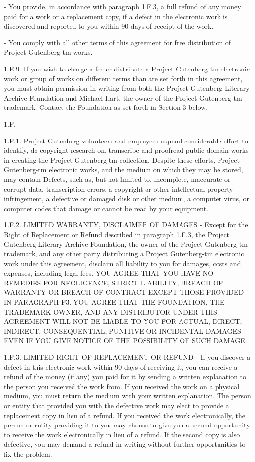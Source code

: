 \documentclass[twocolumn]{article}
\begin{document}
- You provide, in accordance with paragraph 1.F.3, a full refund of any
     money paid for a work or a replacement copy, if a defect in the
     electronic work is discovered and reported to you within 90 days
     of receipt of the work.

- You comply with all other terms of this agreement for free
     distribution of Project Gutenberg-tm works.

1.E.9.  If you wish to charge a fee or distribute a Project Gutenberg-tm
electronic work or group of works on different terms than are set
forth in this agreement, you must obtain permission in writing from
both the Project Gutenberg Literary Archive Foundation and Michael
Hart, the owner of the Project Gutenberg-tm trademark.  Contact the
Foundation as set forth in Section 3 below.

1.F.

1.F.1.  Project Gutenberg volunteers and employees expend considerable
effort to identify, do copyright research on, transcribe and proofread
public domain works in creating the Project Gutenberg-tm
collection.  Despite these efforts, Project Gutenberg-tm electronic
works, and the medium on which they may be stored, may contain
Defects, such as, but not limited to, incomplete, inaccurate or
corrupt data, transcription errors, a copyright or other intellectual
property infringement, a defective or damaged disk or other medium, a
computer virus, or computer codes that damage or cannot be read by
your equipment.

1.F.2.  LIMITED WARRANTY, DISCLAIMER OF DAMAGES - Except for the Right
of Replacement or Refund described in paragraph 1.F.3, the Project
Gutenberg Literary Archive Foundation, the owner of the Project
Gutenberg-tm trademark, and any other party distributing a Project
Gutenberg-tm electronic work under this agreement, disclaim all
liability to you for damages, costs and expenses, including legal
fees.  YOU AGREE THAT YOU HAVE NO REMEDIES FOR NEGLIGENCE, STRICT
LIABILITY, BREACH OF WARRANTY OR BREACH OF CONTRACT EXCEPT THOSE
PROVIDED IN PARAGRAPH F3.  YOU AGREE THAT THE FOUNDATION, THE
TRADEMARK OWNER, AND ANY DISTRIBUTOR UNDER THIS AGREEMENT WILL NOT BE
LIABLE TO YOU FOR ACTUAL, DIRECT, INDIRECT, CONSEQUENTIAL, PUNITIVE OR
INCIDENTAL DAMAGES EVEN IF YOU GIVE NOTICE OF THE POSSIBILITY OF SUCH
DAMAGE.

1.F.3.  LIMITED RIGHT OF REPLACEMENT OR REFUND - If you discover a
defect in this electronic work within 90 days of receiving it, you can
receive a refund of the money (if any) you paid for it by sending a
written explanation to the person you received the work from.  If you
received the work on a physical medium, you must return the medium with
your written explanation.  The person or entity that provided you with
the defective work may elect to provide a replacement copy in lieu of a
refund.  If you received the work electronically, the person or entity
providing it to you may choose to give you a second opportunity to
receive the work electronically in lieu of a refund.  If the second copy
is also defective, you may demand a refund in writing without further
opportunities to fix the problem.
\end{document}
